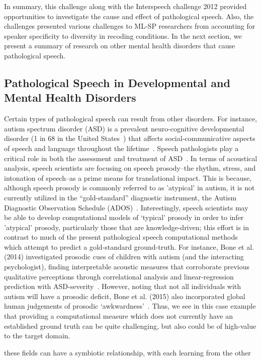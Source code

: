 \documentclass{article}
\begin{document}
In summary, this challenge along with the Interspeech challenge 2012 provided opportunities to investigate the cause and effect of pathological speech.
Also, the challenges presented various challenges to ML-SP researchers from accounting for speaker specificity to diversity in recoding conditions.
In the next section, we present a summary of research on other mental health disorders that cause pathological speech.

\subsection{Pathological Speech in Developmental and Mental Health Disorders}
Certain types of pathological speech can result from other disorders. 
For instance, autism spectrum disorder (ASD) is a prevalent neuro-cognitive developmental disorder (1 in 68 in the United States~\cite{}) that affects social-communicative aspects of speech and language throughout the lifetime~\cite{}. 
Speech pathologists play a critical role in both the assessment and treatment of ASD~\cite{pathologyWebsite}. 
In terms of acoustical analysis, speech scientists are focusing on speech prosody--the rhythm, stress, and intonation of speech--as a prime means for translational impact. 
This is because, although speech prosody is commonly referred to as 'atypical' in autism, it is not currently utilized in the ``gold-standard'' diagnostic instrument, the Autism Diagnostic Observation Schedule (ADOS)~\cite{ADOS2002}. 
Interestingly, speech scientists may be able to develop computational models of `typical' prosody in order to infer 'atypical' prosody, particularly those that are knowledge-driven; this effort is in contrast to much of the present pathological speech computational methods which attempt to predict a gold-standard ground-truth. 
For instance, Bone et al. (2014) investigated prosodic cues of children with autism (and the interacting psychologist), finding interpretable acoustic measures that corroborate previous qualitative perceptions through correlational analysis and linear-regression prediction with ASD-severity~\cite{}. 
However, noting that not all individuals with autism will have a prosodic deficit, Bone et al. (2015) also incorporated global human judgements of prosodic `awkwardness'~\cite{}. 
Thus, we see in this case example that providing a computational measure which does not currently have an established ground truth can be quite challenging, but also could be of high-value to the target domain.

these fields can have a symbiotic relationship, with each learning from the other
\end{document}
